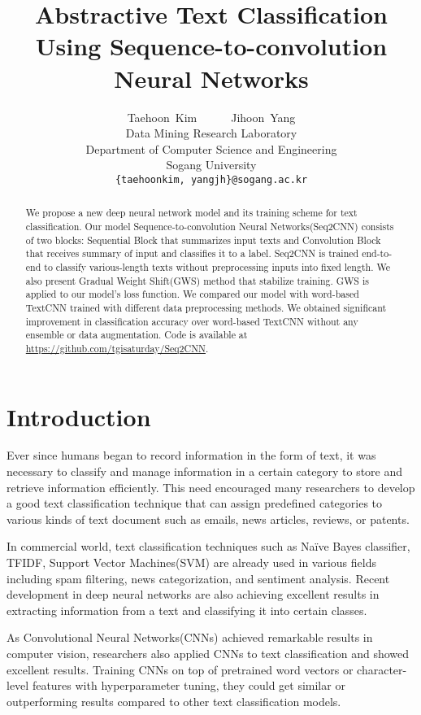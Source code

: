 \documentclass{article}
\title{Abstractive Text Classification Using Sequence-to-convolution Neural Networks}
\author{
  Taehoon~Kim~~~~~~Jihoon~Yang\\     
  Data Mining Research Laboratory \\
  Department of Computer Science and Engineering\\
  Sogang University\\
  \texttt{\{taehoonkim, yangjh\}@sogang.ac.kr} \\
}
\begin{document}
\maketitle

\begin{abstract}
We propose a new deep neural network model and its training scheme for text classification. Our model Sequence-to-convolution Neural Networks(Seq2CNN) consists of two blocks: Sequential Block that summarizes input texts and Convolution Block that receives summary of input and classifies it to a label. Seq2CNN is trained end-to-end to classify various-length texts without preprocessing inputs into fixed length.  We also present Gradual Weight Shift(GWS) method that stabilize training. GWS is applied to our model's loss function.  We compared our model with word-based TextCNN trained with different data preprocessing methods. We obtained significant improvement in classification accuracy over word-based TextCNN without any ensemble or data augmentation. Code is available at \href{https://github.com/tgisaturday/Seq2CNN}{https://github.com/tgisaturday/Seq2CNN}.  
\end{abstract}

\section{Introduction}

Ever since humans began to record information in the form of text, it was necessary to classify and manage information in a certain category to store and retrieve information efficiently. This need encouraged many researchers to develop a good text classification technique that can assign predefined categories to various kinds of text document such as emails, news articles, reviews, or patents. 

In commercial world, text classification techniques such as Naïve Bayes classifier\cite{CHEN20095432}, TFIDF\cite{Yun-tao2005}, Support Vector Machines(SVM)\cite{10.1007/BFb0026683} are already used in various fields including spam filtering, news categorization, and sentiment analysis. Recent development in deep neural networks\cite{DBLP:journals/corr/Kim14f,DBLP:journals/corr/ZhouSLL15b,AAAI159745,DBLP:journals/corr/ZhangZL15,DBLP:journals/corr/ConneauSBL16} are also achieving excellent results in extracting information from a text and classifying it into certain classes. 

As Convolutional Neural Networks(CNNs) achieved remarkable results in computer vision\cite{DBLP:journals/corr/SimonyanZ14a,DBLP:journals/corr/SzegedyIV16,DBLP:journals/corr/HeZRS15,DBLP:journals/corr/RenHG015}, researchers also applied CNNs to text classification\cite{DBLP:journals/corr/Kim14f,AAAI159745,DBLP:journals/corr/ZhangZL15,DBLP:journals/corr/ConneauSBL16} and showed excellent results. Training CNNs on top of pretrained word vectors\cite{DBLP:journals/corr/MikolovSCCD13,DBLP:journals/corr/JoulinGBM16,pennington2014glove} or character-level features\cite{DBLP:journals/corr/ZhangZL15,DBLP:journals/corr/ConneauSBL16} with hyperparameter tuning, they could get similar or outperforming results compared to other text classification models. 
\end{document}
